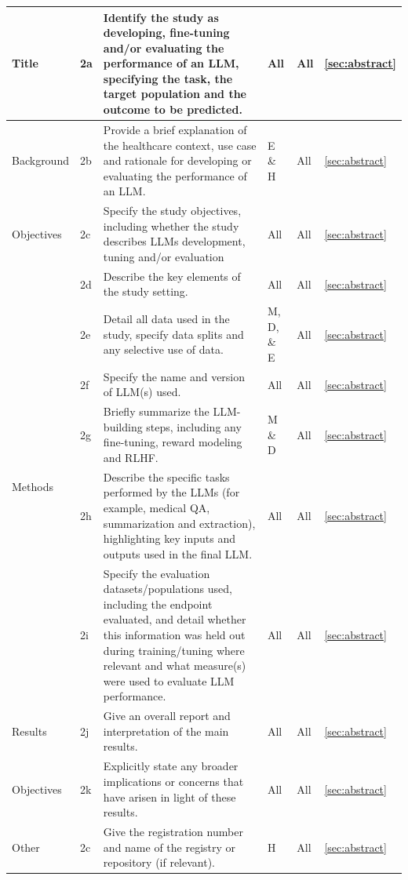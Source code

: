 \documentclass{article}
\begin{document}
\begin{longtable}{p{} l p{} l l l}
         Title & 2a & Identify the study as developing, fine-tuning and/or evaluating the performance of an LLM, specifying the task, the target population and the outcome to be predicted. & All & All & \ref{sec:abstract} \\
         \midrule
         Background &  2b & Provide a brief explanation of the healthcare context, use case and rationale for developing or evaluating the performance of an LLM. & E \& H & All &  \ref{sec:abstract}\\
         \midrule
         Objectives &  2c & Specify the study objectives, including whether the study describes LLMs development, tuning and/or evaluation & All & All & \ref{sec:abstract} \\
         \midrule
        \multirow{6}{4em}{Methods} & 2d & Describe the key elements of the study setting. & All & All & \ref{sec:abstract} \\
        & 2e & Detail all data used in the study, specify data splits and any selective use of data. & M, D, \& E & All & \ref{sec:abstract} \\
        & 2f & Specify the name and version of LLM(s) used. & All & All & \ref{sec:abstract} \\
        & 2g & Briefly summarize the LLM-building steps, including any fine-tuning, reward modeling and RLHF. & M \& D & All & \ref{sec:abstract} \\
        & 2h & Describe the specific tasks performed by the LLMs (for example, medical QA, summarization and extraction), highlighting key inputs and outputs used in the final LLM. & All & All & \ref{sec:abstract} \\
        & 2i & Specify the evaluation datasets/populations used, including the endpoint evaluated, and detail whether this information was held out during training/tuning where relevant and what measure(s) were used to evaluate LLM performance. & All & All & \ref{sec:abstract} \\
        \midrule
        Results &  2j & Give an overall report and interpretation of the main results.  & All & All & \ref{sec:abstract} \\
         \midrule
        Objectives &  2k & Explicitly state any broader implications or concerns that have arisen in light of these results. & All & All & \ref{sec:abstract} \\
         \midrule
        Other &  2c & Give the registration number and name of the registry or repository (if relevant). & H & All &  \ref{sec:abstract}\\
         \bottomrule

     \end{longtable}

        
\end{document}
